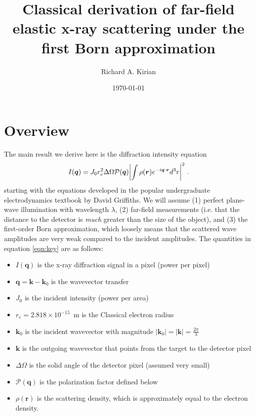 \documentclass[12pt]{article}
\title{Classical derivation of far-field elastic x-ray scattering under the first Born approximation}
\author{Richard A. Kirian}
\date{\today}
\renewcommand{\vec}[1]{\boldsymbol{#1}}
\begin{document}
\maketitle

\section{Overview}
 
The main result we derive here is the diffraction intensity equation
\begin{align}\label{eqn:key}
    I(\vec{q}) = J_0 r_e^2 \Delta \Omega \mathcal{P}(\vec{q})  \qty|\int  
\rho(\vec{r}) e^{-i \vec{q}\cdot\vec{r}} d^3 r |^2 \;.
\end{align}
starting with the equations developed in the popular undergraduate 
electrodynamics textbook by David Griffiths\cite{Griffiths2018}.
We will assume (1) perfect plane-wave illumination with wavelength 
$\lambda$, (2) far-field measurements (i.e. that the distance to the detector is
\emph{much} greater than the size of the object), and (3) the first-order Born 
approximation, which loosely means that the scattered wave amplitudes are very 
weak compared to the incident amplitudes. The quantities in equation 
\ref{eqn:key} are as follows:
\begin{itemize}
\item $I(\vec{q})$ is the x-ray diffraction signal in a pixel (power per 
pixel)
\item $\vec{q}=\vec{k}-\vec{k}_0$ is the wavevector transfer
\item $J_0$ is the incident intensity (power per area)
\item $r_e = 2.818 \times 10^{-15}$~m is the Classical electron radius
\item $\vec{k}_0$ is the incident wavevector with magnitude $|\vec{k}_0| = 
|\vec{k}| = \frac{2\pi}{\lambda}$
\item $\vec{k}$ is the outgoing wavevector that points from the target to the detector pixel
\item $\Delta \Omega$ is the solid angle of the detector pixel (assumed very 
small)
\item $\mathcal{P}(\vec{q})$ is the polarization factor defined below
\item $\rho(\vec{r})$ is the scattering density, which is approximately equal to 
the electron density.
\end{itemize}
\end{document}
